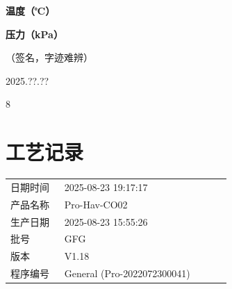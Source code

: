 \documentclass[UTF8,10pt,a4paper,fontset=fandol]{ctexart}
\newcommand{\fieldvalue}[1]{#1}
\newcommand{\handwritten}[1]{#1}
\begin{document}
\begin{center}
\begin{minipage}[t]{0.47\linewidth}
\centering
\textbf{温度（℃）}

\vspace{0.5em}
\end{minipage}
\hfill
\begin{minipage}[t]{0.47\linewidth}
\centering
\textbf{压力（kPa）}

\vspace{0.5em}
\end{minipage}
\end{center}

\vfill

\handwritten{（签名，字迹难辨）}

\handwritten{2025.??.??}

\handwritten{8}

\newpage

\section*{工艺记录}

\begin{tabular}{@{}p{0.22\linewidth}p{0.68\linewidth}@{}}
日期时间 &
\fieldvalue{2025-08-23 19:17:17}
\\
产品名称 &
\fieldvalue{Pro-Hav-CO02}
\\
生产日期 &
\fieldvalue{2025-08-23 15:55:26}
\\
批号 &
\fieldvalue{GFG}
\\
版本 &
\fieldvalue{V1.18}
\\
程序编号 &
\fieldvalue{General (Pro-2022072300041)}
\end{tabular}
\end{document}

